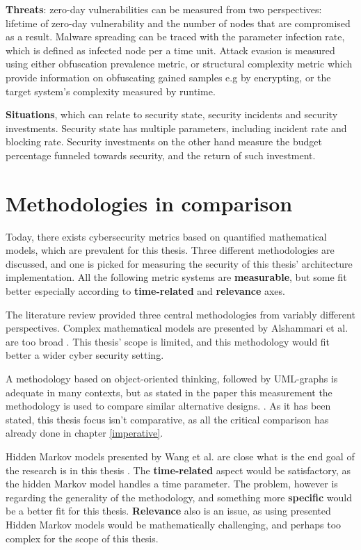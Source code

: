 \textbf{Threats}: zero-day vulnerabilities can be measured from two
perspectives: lifetime of zero-day vulnerability and the number of
nodes that are compromised as a result. Malware spreading can be
traced with the parameter infection rate, which is defined as infected
node per a time unit. Attack evasion is measured using either
obfuscation prevalence metric, or structural complexity metric which
provide information on obfuscating gained samples e.g by encrypting,
or the target system's complexity measured by
runtime. \cite{pendleton2016survey, ramos2017model}

\textbf{Situations}, which can relate to security state, security
incidents and security investments. Security state has multiple
parameters, including incident rate and blocking rate. Security
investments on the other hand measure the budget percentage funneled
towards security, and the return of such
investment. \cite{pendleton2016survey}

\section{Methodologies in comparison} \label{whyqueries}

Today, there exists cybersecurity metrics based on quantified
mathematical models, which are prevalent for this thesis. Three
different methodologies are discussed, and one is picked for measuring
the security of this thesis' architecture implementation. All the following metric
systems are \textbf{measurable}, but some fit better especially
according to \textbf{time-related} and \textbf{relevance} axes.

The literature review provided three central methodologies from
variably different perspectives. Complex mathematical models are
presented by Alshammari et al. are too broad
\cite{alshammari2009security}. This thesis' scope is limited, and this
methodology would fit better a wider cyber security setting.

A methodology based on object-oriented thinking, followed by
UML-graphs is adequate in many contexts, but as stated in the paper
this measurement the methodology is used to compare similar
alternative designs. \cite{alshammari2009security}. As it has been
stated, this thesis focus isn't comparative, as all the critical
comparison has already done in chapter \ref{imperative}.

Hidden Markov models presented by Wang et al. are close what is the
end goal of the research is in this thesis
\cite{wang2010framework}. The \textbf{time-related} aspect would be
satisfactory, as the hidden Markov model handles a time
parameter. The problem, however is regarding the generality of the
methodology, and something more \textbf{specific} would be a better
fit for this thesis. \textbf{Relevance} also is an issue, as using
presented Hidden Markov models would be mathematically challenging,
and perhaps too complex for the scope of this thesis.

